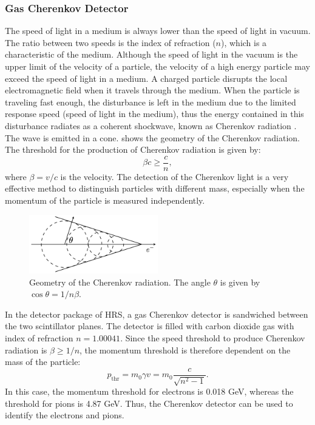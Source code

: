 \subsubsection{Gas Cherenkov Detector}

The speed of light in a medium is always lower than the speed of light in vacuum. The ratio between two speeds is the index of refraction ($n$), which is a characteristic of the medium. Although the speed of light in the vacuum is the upper limit of the velocity of a particle, the velocity of a high energy particle may exceed the speed of light in a medium. A charged particle disrupts the local electromagnetic field when it travels through the medium. When the particle is traveling fast enough, the disturbance is left in the medium due to the limited response speed (speed of light in the medium), thus the energy contained in this disturbance radiates as a coherent shockwave, known as Cherenkov radiation \cite{Leo1994}. The wave is emitted in a cone.  shows the geometry of the Cherenkov radiation. The threshold for the production of Cherenkov radiation is given by:
\begin{equation} \label{C5S4SS2E4}
\beta c \geq\frac{c}{n},
\end{equation}
where $\beta=v/c$ is the velocity. The detection of the Cherenkov light is a very effective method to distinguish particles with different mass, especially when the momentum of the particle is measured independently.

\begin{figure}[tb!]
  \centering
  \includegraphics[width=0.5\textwidth]{figs/Cherenkov-radiation.png}
  \caption[Geometry of the Cherenkov radiation.]{Geometry of the Cherenkov radiation. The angle $\theta$ is given by $\cos\theta=1/n\beta$. \label{C5S4SS2F4}}
\end{figure}

In the detector package of HRS, a gas Cherenkov detector \cite{Iodice1998} is sandwiched between the two scintillator planes. The detector is filled with carbon dioxide gas with index of refraction $n=1.00041$. Since the speed threshold to produce Cherenkov radiation is $\beta\geq1/n$, the momentum threshold is therefore dependent on the mass of the particle:
\begin{equation} \label{C5S4SS2E5}
p_{\mathrm{thr}} = m_0\gamma v = m_0\frac{c}{\sqrt{n^2-1}}.
\end{equation}
In this case, the momentum threshold for electrons is 0.018 GeV, whereas the threshold for pions is 4.87 GeV. Thus, the Cherenkov detector can be used to identify the electrons and pions.

